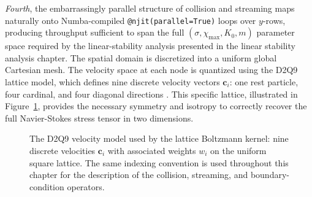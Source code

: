 \emph{Fourth}, the embarrassingly parallel structure of collision and streaming maps naturally onto Numba-compiled \texttt{@njit(parallel=True)} loops over $y$-rows, producing throughput sufficient to span the full $(\sigma, \chi_{\max}, K_0, m)$ parameter space required by the linear-stability analysis presented in the linear stability analysis chapter.
The spatial domain is discretized into a uniform global Cartesian mesh.
The velocity space at each node is quantized using the D2Q9 lattice model, which defines nine discrete velocity vectors $\mathbf{c}_i$: one rest particle, four cardinal, and four diagonal directions \cite{qian1992lattice}.
This specific lattice, illustrated in Figure~\ref{fig:d2q9-lattice}, provides the necessary symmetry and isotropy to correctly recover the full Navier-Stokes stress tensor in two dimensions.

\begin{figure}[H]
    \centering
    \caption{The D2Q9 velocity model used by the lattice Boltzmann kernel: nine discrete velocities $\bm{c}_i$ with associated weights $w_i$ on the uniform square lattice. The same indexing convention is used throughout this chapter for the description of the collision, streaming, and boundary-condition operators.}
    \label{fig:d2q9-lattice}
\end{figure}

